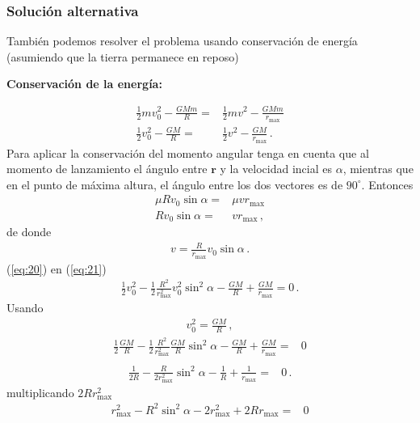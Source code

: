\subsubsection*{Solución alternativa} 
También podemos resolver el problema usando conservación de energía (asumiendo que la tierra permanece en reposo)
\begin{frame}
\textbf{Conservación de la energía:}

  \begin{align}
    \label{eq:21}
    \frac{1}{2}m v_0^2-\frac{GMm}{R}=&\frac{1}{2}mv^2-\frac{GMm}{r_{\text{max}}}\nonumber\\
    \frac{1}{2}v_0^2-\frac{GM}{R}=&\frac{1}{2}v^2-\frac{GM}{r_{\text{max}}}\,.
  \end{align}
Para aplicar la conservación del momento angular tenga en cuenta que al momento de lanzamiento el ángulo entre $\mathbf{r}$ y la velocidad incial es $\alpha$, mientras que en el punto de máxima altura, el ángulo entre los dos vectores es de $90^\circ$. Entonces
  \begin{align}
    \mu R v_0 \sin\alpha=&\mu v r_{\text{max}}\nonumber\\
     R v_0 \sin\alpha=&v r_{\text{max}}\,,
  \end{align}
de donde
\begin{align}
  \label{eq:20}
  v=\frac{R}{r_{\text{max}}}v_0 \sin\alpha\,.
\end{align}
(\ref{eq:20}) en (\ref{eq:21})
\begin{align}
  \frac{1}{2}v_0^2-\frac{1}{2}\frac{R^2}{r^2_{\text{max}}}v^2_0 \sin^2\alpha-\frac{GM}{R}+\frac{GM}{r_{\text{max}}}=0\,.
\end{align}
Usando
\begin{align}
  v_0^2=\frac{GM}{R}\,,
\end{align}
\begin{align}
    \frac{1}{2}\frac{GM}{R}-\frac{1}{2}\frac{R^2}{r^2_{\text{max}}}\frac{GM}{R} \sin^2\alpha-\frac{GM}{R}+\frac{GM}{r_{\text{max}}}=&0\nonumber\\
\end{align}
\begin{align}
      \frac{1}{2R}-\frac{R}{2r^2_{\text{max}}} \sin^2\alpha-\frac{1}{R}+\frac{1}{r_{\text{max}}}=&0\,.
\end{align}
multiplicando $2R r_{\text{max}}^2$ 
\begin{align}
 r_{\text{max}}^2-{R^2} \sin^2\alpha-2 r^2_{\text{max}}+2Rr_{\text{max}}=&0\nonumber\\

\end{align}
\end{frame}

